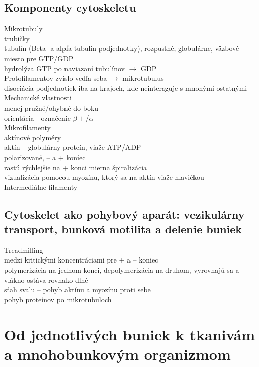 \subsection{Komponenty cytoskeletu}
Mikrotubuly\\
\tab trubičky\\
\tab tubulín (Beta- a alpfa-tubulín podjednotky), rozpustné, globulárne, väzbové miesto pre GTP/GDP\\
\tab hydrolýza GTP po naviazaní tubulínov $\rightarrow$ GDP\\
 Protofilamentov zvislo vedľa seba $\rightarrow$ mikrotubulus\\
\tab disociácia podjednotiek iba na krajoch, kde neinteraguje s mnohými ostatnými\\

Mechanické vlastnosti\\
\tab menej pružné/ohybné do boku\\
\tab orientácia - označenie $\beta+$/$\alpha-$\\

Mikrofilamenty\\
\tab aktínové polyméry\\
\tab aktín -- globulárny proteín, viaže ATP/ADP\\
\tab polarizované, -- a + koniec\\
\tab rastú rýchlejšie na + konci
\tab mierna špiralizácia\\
\tab vizualizácia pomocou myozínu, ktorý sa na aktín viaže hlavičkou\\

Intermediálne filamenty\\
\subsection{Cytoskelet ako pohybový aparát: vezikulárny transport, bunková motilita a delenie buniek}
Treadmilling\\
\tab medzi kritickými koncentráciami pre + a -- koniec\\
\tab polymerizácia na jednom konci, depolymerizácia na druhom, vyrovnajú sa a vlákno ostáva rovnako dlhé\\
sťah svalu -- pohyb aktínu a myozínu proti sebe\\
pohyb proteínov po mikrotubuloch\\

\section{Od jednotlivých buniek k tkanivám a mnohobunkovým organizmom}


